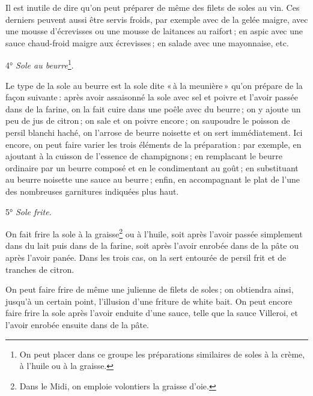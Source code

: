 \sk

Il est inutile de dire qu'on peut préparer de même des filets de soles au vin.
Ces derniers peuvent aussi être servis froids, par exemple avec de la gelée
maigre, avec une mousse d'écrevisses ou une mousse de laitances au raifort ; en
aspic avec une sauce chaud-froid maigre aux écrevisses ; en salade avec une
mayonnaise, etc.

\begin{center}
4° \textit{Sole au beurre}\footnote{On peut placer dans ce groupe les préparations
                                   similaires de soles à la crème, à l'huile ou à la graisse.}.
\end{center}

Le type de la sole au beurre est la sole dite « à la meunière » qu'on prépare
de la façon suivante : après avoir assaisonné la sole avec sel et poivre et
l'avoir passée dans de la farine, on la fait cuire dans une poêle avec du
beurre ; on y ajoute un peu de jus de citron ; on sale et on poivre encore ; on
saupoudre le poisson de persil blanchi haché, on l'arrose de beurre noisette et
on sert immédiatement. Ici encore, on peut faire varier les trois éléments de
la préparation : par exemple, en ajoutant à la cuisson de l'essence de
champignons ; en remplacant le beurre ordinaire par un beurre composé et en le
condimentant au goût ; en substituant au beurre noisette une sauce au beurre ;
enfin, en accompagnant le plat de l’une des nombreuses garnitures indiquées
plus haut.

\begin{center}
5° \textit{Sole frite.}
\end{center}

On fait frire la sole à la graisse\footnote{Dans le Midi, on emploie volontiers
la graisse d'oie.} ou à l'huile, soit après l'avoir passée simplement dans du
lait puis dans de la farine, soit après l'avoir enrobée dans de la pâte ou
après l'avoir panée. Dans les trois cas, on la sert entourée de persil frit et
de tranches de citron.

On peut faire frire de même une julienne de filets de soles ; on obtiendra
ainsi, jusqu'à un certain point, l'illusion d'une friture de white bait. On
peut encore faire frire la sole après l'avoir enduite d'une sauce, telle que la
sauce Villeroi, et l'avoir enrobée ensuite dans de la pâte.


